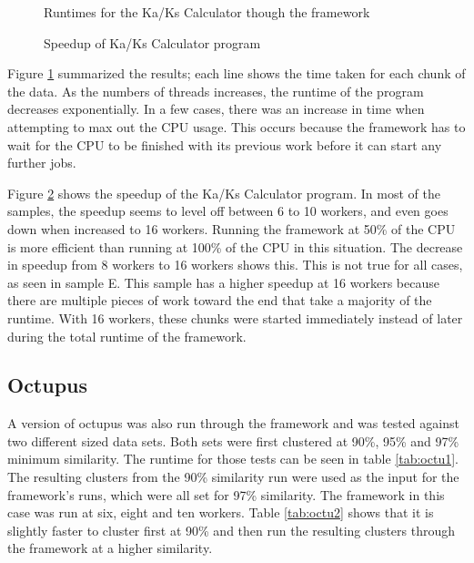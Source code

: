 \documentclass[12pt]{article}
\begin{document}
\begin{figure}
    \begin{center}
    \end{center}
    \caption{Runtimes for the Ka/Ks Calculator though the framework}
    \label{fig:time}
\end{figure}

\begin{figure}
    \begin{center}
    \end{center}
    \caption{Speedup of Ka/Ks Calculator program}
    \label{fig:speedup}
\end{figure}

Figure \ref{fig:time} summarized the results; each line shows the time taken for
each chunk of the data. As the numbers of threads increases, the runtime of the
program decreases exponentially. In a few cases, there was an increase in time
when attempting to max out the CPU usage. This occurs because the framework has
to wait for the CPU to be finished with its previous work before it can start
any further jobs. 

Figure \ref{fig:speedup} shows the speedup of the Ka/Ks Calculator program. 
In most of the samples, the speedup seems to level off between 6 to 10 workers,
and even goes down when increased to 16 workers. Running the framework at 50\% 
of the CPU is more efficient than running at 100\% of the CPU in this 
situation. The decrease in speedup from 8 workers to 16 workers shows this.
This is not true for all cases, as seen in sample E. This sample has a higher
speedup at 16 workers because there are multiple pieces of work toward the end
that take a majority of the runtime. With 16 workers, these chunks were started
immediately instead of later during the total runtime of the framework.

\subsection{Octupus}

A version of octupus was also run through the framework and was tested against
two different sized data sets. Both sets were first clustered at 90\%, 95\% and
97\% minimum similarity. The runtime for those tests can be seen in table
\ref{tab:octu1}. The resulting clusters from the 90\% similarity run were used as
the input for the framework's runs, which were all set for 97\% similarity. 
The framework in this case was run at six, eight and ten workers. Table 
\ref{tab:octu2} shows that it is slightly faster to cluster first at 90\% and 
then run the resulting clusters through the framework at a higher similarity. 
\end{document}
